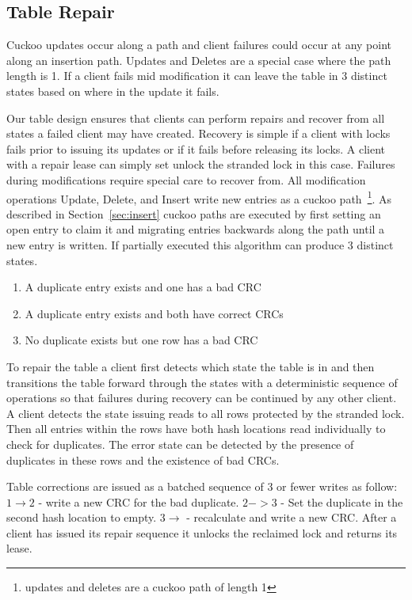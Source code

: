 \subsection{Table Repair} 
\label{sec:table-repair}

Cuckoo updates occur along a path
and client failures could occur at any point along an
insertion path. Updates and Deletes are a special case where
the path length is 1. If a client fails mid modification it
can leave the table in 3 distinct states based on where in
the update it fails. 

Our table design ensures that clients can perform repairs
and recover from all states a failed client may have
created. Recovery is simple if a client with locks fails
prior to issuing its updates or if it fails before releasing
its locks. A client with a repair lease can simply set
unlock the stranded lock in this case. Failures during
modifications require special care to recover from. All
modification operations Update, Delete, and Insert write new
entries as a cuckoo path~\footnote{updates and deletes are a
cuckoo path of length 1}. As described in
Section~\ref{sec:insert} cuckoo paths are executed by first
setting an open entry to claim it and migrating entries
backwards along the path until a new entry is written. If
partially executed this algorithm can produce 3 distinct
states.

\begin{enumerate}
    \item{A duplicate entry exists and one has a bad CRC}
    \item{A duplicate entry exists and both have correct CRCs} 
    \item{No duplicate exists but one row has a bad CRC}
\end{enumerate}

To repair the table a client first detects which state the
table is in and then transitions the table forward through
the states with a deterministic sequence of operations so
that failures during recovery can be continued by any other
client. A client detects the state issuing reads to all rows
protected by the stranded lock. Then all entries within the
rows have both hash locations read individually to check for
duplicates. The error state can be detected by the presence
of duplicates in these rows and the existence of bad CRCs.

Table corrections are issued as a batched sequence of 3 or
fewer writes as follow: $1 \rightarrow 2$ - write a new CRC
for the bad duplicate.  $2->3$ - Set the duplicate in the
second hash location to empty. $3\rightarrow$ - recalculate
and write a new CRC. After a client has issued its repair
sequence it unlocks the reclaimed lock and returns its
lease.


